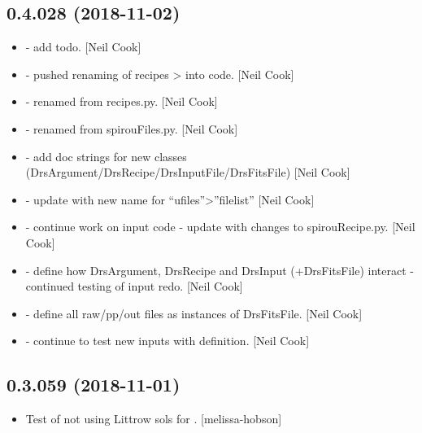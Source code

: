 \documentclass[a4paper,10pt,english]{report}
\begin{document}
\subsection{0.4.028 (2018-11-02)}
\label{\detokenize{misc/changelog:id271}}\begin{itemize}
\item {} 
 - add todo. {[}Neil Cook{]}

\item {} 
 - pushed renaming of recipes \textendash{}\textgreater{}  into
code. {[}Neil Cook{]}

\item {} 
 - renamed from recipes.py. {[}Neil Cook{]}

\item {} 
 - renamed from spirouFiles.py. {[}Neil Cook{]}

\item {} 
 - add doc strings for new classes
(DrsArgument/DrsRecipe/DrsInputFile/DrsFitsFile) {[}Neil Cook{]}

\item {} 
 - update with new name for “ufiles”\textendash{}\textgreater{}”filelist” {[}Neil
Cook{]}

\item {} 
 - continue work on input code - update with changes
to spirouRecipe.py. {[}Neil Cook{]}

\item {} 
 - define how DrsArgument, DrsRecipe and DrsInput
(+DrsFitsFile) interact - continued testing of input redo. {[}Neil Cook{]}

\item {} 
 - define all raw/pp/out files as instances of
DrsFitsFile. {[}Neil Cook{]}

\item {} 
 - continue to test new inputs with  definition.
{[}Neil Cook{]}

\end{itemize}


\subsection{0.3.059 (2018-11-01)}
\label{\detokenize{misc/changelog:id272}}\begin{itemize}
\item {} 
Test of not using Littrow sols for . {[}melissa-hobson{]}

\end{itemize}
\end{document}
